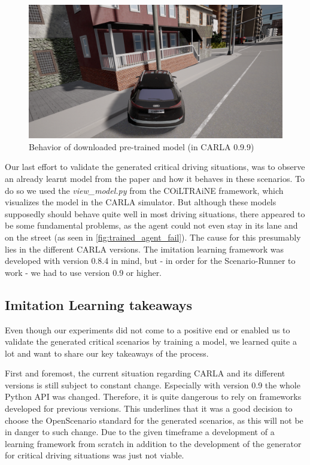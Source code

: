 \documentclass[conference, a4paper, 11pt]{IEEEtran}
\begin{document}
	\begin{figure}[ht]
		\centering
		\includegraphics[width=0.9\linewidth]{figures/trained_agent_fail.png}
		\caption{Behavior of downloaded pre-trained model (in CARLA 0.9.9)}
		\label{fig:trained_agent_fail}
	\end{figure}
	
	Our last effort to validate the generated critical driving situations, was to observe an already learnt model from the paper  \cite{Codevilla:OnOfflineEvaluation} and how it behaves in these scenarios. To do so we used the \textit{view\_model.py} from the COiLTRAiNE framework, which visualizes the model in the CARLA simulator. But although these models supposedly should behave quite well in most driving situations, there appeared to be some fundamental problems, as the agent could not even stay in its lane and on the street (as seen in \autoref{fig:trained_agent_fail}). The cause for this presumably lies in the different CARLA versions. The imitation learning framework was developed with version 0.8.4 in mind, but - in order for the Scenario-Runner to work - we had to use version 0.9 or higher.
	
	\subsection{Imitation Learning takeaways}
	
	Even though our experiments did not come to a positive end or enabled us to validate the generated critical scenarios by training a model, we learned quite a lot and want to share our key takeaways of the process.
	
	First and foremost, the current situation regarding CARLA and its different versions is still subject to constant change. Especially with version 0.9 the whole Python API was changed. Therefore, it is quite dangerous to rely on frameworks developed for previous versions. This underlines that it was a good decision to choose the OpenScenario standard for the generated scenarios, as this will not be in danger to such change.
	Due to the given timeframe a development of a learning framework from scratch in addition to the development of the generator for critical driving situations was just not viable.
	
\end{document}
